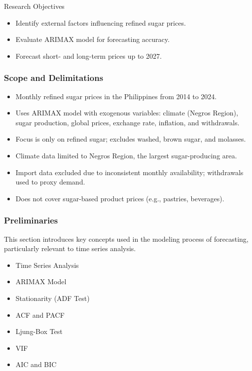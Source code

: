 \documentclass[12pt, aspectratio=169]{beamer}
\begin{document}
\begin{frame}{Research Objectives}
  \begin{itemize}
    \item Identify external factors influencing refined sugar prices.
    \item Evaluate ARIMAX model for forecasting accuracy.
    \item Forecast short- and long-term prices up to 2027.
  \end{itemize}
\end{frame}

\begin{frame}
\frametitle{Scope and Delimitations}

    \begin{itemize}
        \item Monthly refined sugar prices in the Philippines from 2014 to 2024.
        \item Uses ARIMAX model with exogenous variables: climate (Negros Region), sugar production, global prices, exchange rate, inflation, and withdrawals.
        \item Focus is only on refined sugar; excludes washed, brown sugar, and molasses.
        \item Climate data limited to Negros Region, the largest sugar-producing area.
        \item Import data excluded due to inconsistent monthly availability; withdrawals used to proxy demand.
        \item Does not cover sugar-based product prices (e.g., pastries, beverages).
    \end{itemize}
\end{frame}


\begin{frame}
\frametitle{Preliminaries}
This section introduces key concepts used in the modeling process of forecasting, particularly relevant to time series analysis.
\begin{itemize}
    \item Time Series Analysis
    \item ARIMAX Model
    \item Stationarity (ADF Test)
    \item ACF and PACF
    \item Ljung-Box Test
    \item VIF
    \item AIC and BIC
\end{itemize}
\end{frame}
\end{document}
